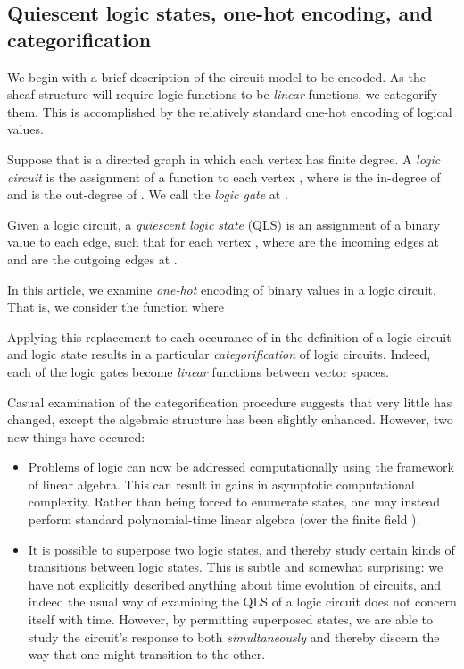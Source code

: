 \documentclass{amsart}
\theoremstyle{plain}
\theoremstyle{definition}
\begin{document}
\subsection{Quiescent logic states, one-hot encoding, and categorification}
We begin with a brief description of the circuit model to be encoded.
As the sheaf structure will require logic functions to be {\it linear}
functions, we categorify them.  This is accomplished by the relatively
standard one-hot encoding of logical values.

Suppose that  is a directed graph in which each vertex has finite
degree.  A {\it logic circuit} is the assignment of a function
 to each vertex , 
 where  is the in-degree of  and  is the out-degree of
 .  We call  the {\it logic gate} at .

Given a logic circuit, a {\it quiescent logic state} (QLS) is an assignment  of a binary value to each edge, such that for each
vertex ,  where
 are the incoming edges at  and  are the
outgoing edges at .

In this article, we examine {\it one-hot} encoding  of binary values in
a logic circuit.  That is, we consider the function
 where 


Applying this replacement to
    each occurance of  in the definition of a logic
    circuit and logic state results in a particular {\it
      categorification} of logic circuits.  Indeed, each of the logic
    gates  become {\it linear} functions  between  vector
    spaces. 

Casual examination of the categorification procedure suggests that
very little has changed, except the algebraic structure has been
slightly enhanced.  However, two new things have occured:
\begin{itemize}
\item Problems of logic can now be addressed computationally using the
  framework of linear algebra.  This can result in gains in asymptotic
  computational complexity.  Rather than being forced to enumerate
  states, one may instead perform standard polynomial-time linear
  algebra (over the finite field ).
\item It is possible to superpose two logic states, and thereby
  study certain kinds of transitions between logic states.  This is
  subtle and somewhat surprising: we have not explicitly described
  anything about time evolution of circuits, and indeed the usual way
  of examining the QLS of a logic circuit does not concern itself with
  time.  However, by permitting superposed states, we are able to
  study the circuit's response to both {\it simultaneously} and
  thereby discern the way that one might transition to the other. 
\end{itemize} 
\end{document}

